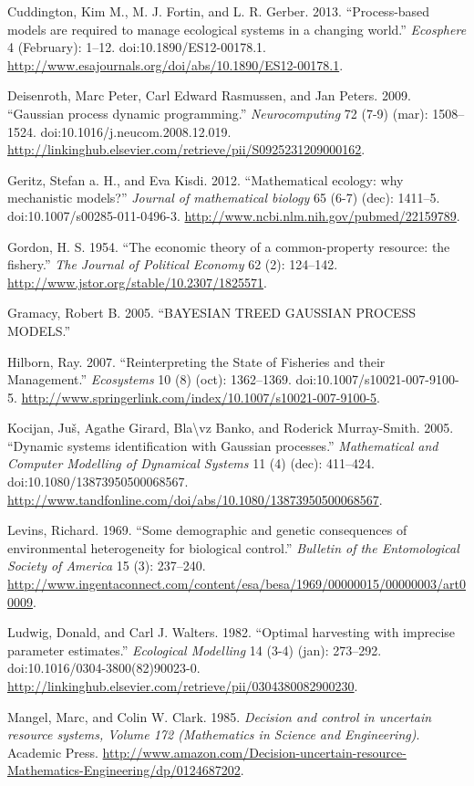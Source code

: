 \documentclass[author-year, review]{elsarticle} %
\begin{document}
Cuddington, Kim M., M. J. Fortin, and L. R. Gerber. 2013.
``Process-based models are required to manage ecological systems in a
changing world.'' \emph{Ecosphere} 4 (February): 1--12.
doi:10.1890/ES12-00178.1.
\url{http://www.esajournals.org/doi/abs/10.1890/ES12-00178.1}.

Deisenroth, Marc Peter, Carl Edward Rasmussen, and Jan Peters. 2009.
``Gaussian process dynamic programming.'' \emph{Neurocomputing} 72 (7-9)
(mar): 1508--1524. doi:10.1016/j.neucom.2008.12.019.
\url{http://linkinghub.elsevier.com/retrieve/pii/S0925231209000162}.

Geritz, Stefan a. H., and Eva Kisdi. 2012. ``Mathematical ecology: why
mechanistic models?'' \emph{Journal of mathematical biology} 65 (6-7)
(dec): 1411--5. doi:10.1007/s00285-011-0496-3.
\url{http://www.ncbi.nlm.nih.gov/pubmed/22159789}.

Gordon, H. S. 1954. ``The economic theory of a common-property resource:
the fishery.'' \emph{The Journal of Political Economy} 62 (2): 124--142.
\url{http://www.jstor.org/stable/10.2307/1825571}.

Gramacy, Robert B. 2005. ``BAYESIAN TREED GAUSSIAN PROCESS MODELS.''

Hilborn, Ray. 2007. ``Reinterpreting the State of Fisheries and their
Management.'' \emph{Ecosystems} 10 (8) (oct): 1362--1369.
doi:10.1007/s10021-007-9100-5.
\url{http://www.springerlink.com/index/10.1007/s10021-007-9100-5}.

Kocijan, Juš, Agathe Girard, Bla\textbackslash{}vz Banko, and Roderick
Murray-Smith. 2005. ``Dynamic systems identification with Gaussian
processes.'' \emph{Mathematical and Computer Modelling of Dynamical
Systems} 11 (4) (dec): 411--424. doi:10.1080/13873950500068567.
\url{http://www.tandfonline.com/doi/abs/10.1080/13873950500068567}.

Levins, Richard. 1969. ``Some demographic and genetic consequences of
environmental heterogeneity for biological control.'' \emph{Bulletin of
the Entomological Society of America} 15 (3): 237--240.
\url{http://www.ingentaconnect.com/content/esa/besa/1969/00000015/00000003/art00009}.

Ludwig, Donald, and Carl J. Walters. 1982. ``Optimal harvesting with
imprecise parameter estimates.'' \emph{Ecological Modelling} 14 (3-4)
(jan): 273--292. doi:10.1016/0304-3800(82)90023-0.
\url{http://linkinghub.elsevier.com/retrieve/pii/0304380082900230}.

Mangel, Marc, and Colin W. Clark. 1985. \emph{Decision and control in
uncertain resource systems, Volume 172 (Mathematics in Science and
Engineering)}. Academic Press.
\url{http://www.amazon.com/Decision-uncertain-resource-Mathematics-Engineering/dp/0124687202}.
\end{document}
